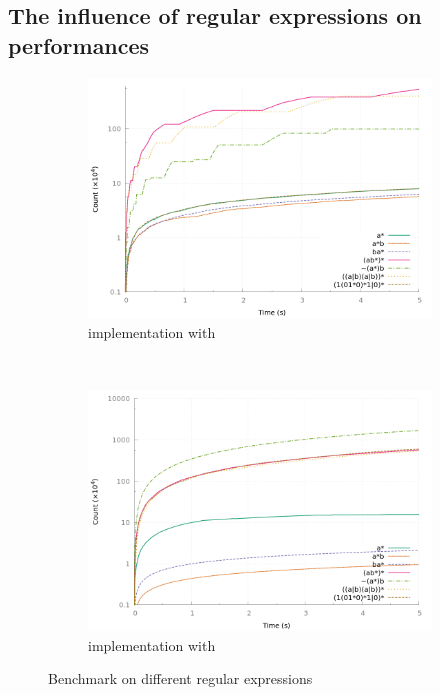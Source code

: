 \subsection{The influence of regular expressions on performances}


\begin{figure}[h]
  \centering
  \begin{subfigure}{0.5\linewidth}
    \includegraphics[width=\linewidth]{measure/haskell_langs.png}
    \caption{\haskell implementation with }
    \label{bench:haskell:langs}
  \end{subfigure}~
  \begin{subfigure}{0.5\linewidth}
    \includegraphics[width=\linewidth]{measure/ocaml_langs.png}
    \caption{\ocaml implementation with }
    \label{bench:ocaml:langs}
  \end{subfigure}
  \caption{Benchmark on different regular expressions}
  \label{bench:langs}
\end{figure}

